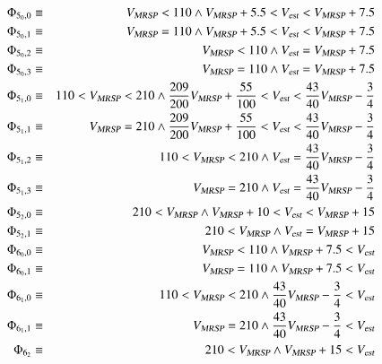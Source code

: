 \begin{eqnarray*}
\Phi_{5_0,0} & \equiv &  \vmax < 110 \wedge \vmax + 5.5 < \vest < \vmax + 7.5 
\\
\Phi_{5_0,1} & \equiv &  \vmax = 110 \wedge \vmax + 5.5 < \vest <  \vmax + 7.5 
\\
\Phi_{5_0,2} & \equiv &  \vmax < 110 \wedge  \vest =  \vmax + 7.5 
\\
\Phi_{5_0,3} & \equiv &  \vmax = 110 \wedge  \vest =  \vmax + 7.5 
\\
\Phi_{5_1,0} & \equiv &   110<\vmax < 210 \wedge \frac{209}{200}\vmax +\frac{55}{100}< \vest <  \frac{43}{40}\vmax -\frac{3}{4}
\\
\Phi_{5_1,1} & \equiv &   \vmax =210 \wedge \frac{209}{200}\vmax +\frac{55}{100}< \vest <  \frac{43}{40}\vmax -\frac{3}{4}
\\
\Phi_{5_1,2} & \equiv &  110< \vmax < 210 \wedge \vest = \frac{43}{40}\vmax -\frac{3}{4}
\\
\Phi_{5_1,3} & \equiv &   \vmax = 210 \wedge \vest =  \frac{43}{40}\vmax -\frac{3}{4}
\\
\Phi_{5_2,0} & \equiv &   210<\vmax   \wedge \vmax +10 < \vest <  \vmax +15 
\\
\Phi_{5_2,1} & \equiv &   210<\vmax   \wedge  \vest =  \vmax +15 
\\
\Phi_{6_0,0} & \equiv & \vmax < 110 \wedge \vmax + 7.5 < \vest 
\\
\Phi_{6_0,1} & \equiv & \vmax = 110 \wedge \vmax + 7.5 < \vest 
\\
\Phi_{6_1,0} & \equiv &  110<\vmax < 210 \wedge  \frac{43}{40}\vmax -\frac{3}{4}< \vest 
\\
\Phi_{6_1,1} & \equiv &  \vmax = 210 \wedge  \frac{43}{40}\vmax -\frac{3}{4}< \vest 
\\
\Phi_{6_2} & \equiv &   210<\vmax   \wedge \vmax +15 < \vest 
\end{eqnarray*}


